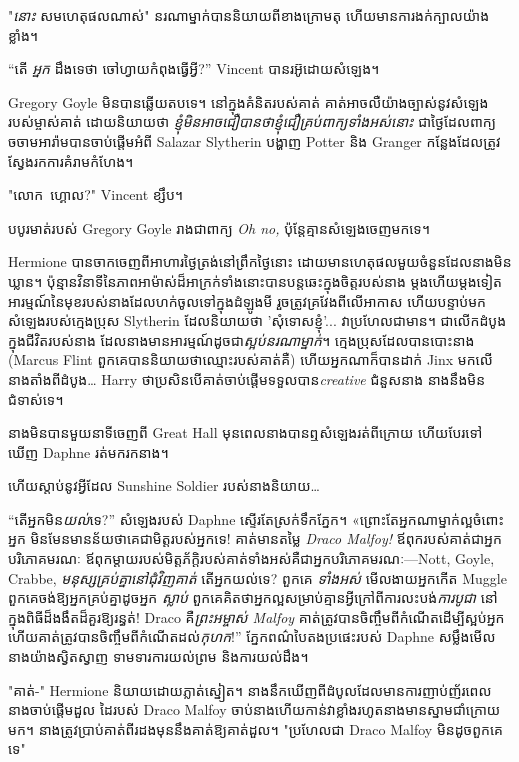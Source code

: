 {{{{"\emph{នោះ} សមហេតុផលណាស់" នរណាម្នាក់បាននិយាយពីខាងក្រោមតុ ហើយមានការងក់ក្បាលយ៉ាងខ្លាំង។

\later

“តើ \emph{អ្នក} ដឹងទេថា ចៅហ្វាយកំពុងធ្វើអ្វី?” Vincent បាន​រអ៊ូ​ដោយ​សំឡេង។

Gregory Goyle មិនបានឆ្លើយតបទេ។ នៅក្នុងគំនិតរបស់គាត់ គាត់អាចលឺយ៉ាងច្បាស់នូវសំឡេងរបស់ម្ចាស់គាត់ ដោយនិយាយថា \emph{ខ្ញុំមិនអាចជឿបានថាខ្ញុំជឿគ្រប់ពាក្យទាំងអស់នោះ} ជាថ្ងៃដែលពាក្យចចាមអារ៉ាមបានចាប់ផ្តើមអំពី Salazar Slytherin បង្ហាញ Potter និង Granger កន្លែងដែលត្រូវស្វែងរកការគំរាមកំហែង។

"លោក~ហ្គោល?" Vincent ខ្សឹប។

បបូរមាត់របស់ Gregory Goyle រាងជាពាក្យ \emph{Oh no,} ប៉ុន្តែគ្មានសំឡេងចេញមកទេ។

\later

Hermione បាន​ចាកចេញ​ពី​អាហារ​ថ្ងៃត្រង់​នៅ​ព្រឹក​ថ្ងៃ​នោះ ដោយ​មាន​ហេតុផល​មួយ​ចំនួន​ដែល​នាង​មិន​ឃ្លាន។ ប៉ុន្មានវិនាទីនៃភាពអាម៉ាស់ដ៏អាក្រក់ទាំងនោះបានបន្តឆេះក្នុងចិត្តរបស់នាង ម្តងហើយម្តងទៀត អារម្មណ៍នៃមុខរបស់នាងដែលហក់ចូលទៅក្នុងដំឡូងមី រួចត្រូវគ្រវែងពីលើអាកាស ហើយបន្ទាប់មកសំឡេងរបស់ក្មេងប្រុស Slytherin ដែលនិយាយថា 'សុំទោសខ្ញុំ'... វាប្រហែលជាមាន។ ជាលើកដំបូងក្នុងជីវិតរបស់នាង ដែលនាងមានអារម្មណ៍ដូចជា\emph{ស្អប់នរណាម្នាក់}។ ក្មេងប្រុសដែលបានបោះនាង (Marcus Flint ពួកគេបាននិយាយថាឈ្មោះរបស់គាត់គឺ) ហើយអ្នកណាក៏បានដាក់ Jinx មកលើនាងតាំងពីដំបូង… Harry ថាប្រសិនបើគាត់ចាប់ផ្តើមទទួលបាន\emph{creative} ជំនួសនាង នាងនឹងមិនជំទាស់ទេ។

នាង​មិន​បាន​មួយ​នាទី​ចេញ​ពី Great Hall មុន​ពេល​នាង​បាន​ឮ​សំឡេង​រត់​ពី​ក្រោយ ហើយ​បែរ​ទៅ​ឃើញ Daphne រត់​មក​រក​នាង។

ហើយស្តាប់នូវអ្វីដែល Sunshine Soldier របស់នាងនិយាយ…

“តើអ្នកមិន\emph{យល់}ទេ?” សំឡេងរបស់ Daphne ស្ទើរតែស្រក់ទឹកភ្នែក។ «ព្រោះ​តែ​អ្នក​ណា​ម្នាក់​ល្អ​ចំពោះ​អ្នក មិន​មែន​មាន​ន័យ​ថា​គេ​ជា​មិត្ត​របស់​អ្នក​ទេ! គាត់មានតម្លៃ \emph{Draco Malfoy!} ឪពុករបស់គាត់ជាអ្នកបរិភោគមរណៈ ឪពុកម្តាយរបស់មិត្តភ័ក្តិរបស់គាត់ទាំងអស់គឺជាអ្នកបរិភោគមរណៈ—Nott, Goyle, Crabbe, \emph{មនុស្សគ្រប់គ្នានៅជុំវិញគាត់} តើអ្នកយល់ទេ? ពួកគេ \emph{ទាំងអស់} មើលងាយអ្នកកើត Muggle ពួកគេចង់ឱ្យអ្នកគ្រប់គ្នាដូចអ្នក \emph{ស្លាប់} ពួកគេគិតថាអ្នកល្អសម្រាប់គ្មានអ្វីក្រៅពីការលះបង់\emph{ការបូជា} នៅក្នុងពិធីដ៏ងងឹតដ៏គួរឱ្យរន្ធត់! Draco គឺ\emph{ព្រះអម្ចាស់ Malfoy} គាត់ត្រូវបានចិញ្ចឹមពីកំណើតដើម្បីស្អប់អ្នក ហើយគាត់ត្រូវបានចិញ្ចឹមពីកំណើតដល់\emph{កុហក}!” ភ្នែកពណ៌បៃតងប្រផេះរបស់ Daphne សម្លឹងមើលនាងយ៉ាងស្វិតស្វាញ ទាមទារការយល់ព្រម និងការយល់ដឹង។

"គាត់-" Hermione និយាយដោយភ្លាត់ស្នៀត។ នាង​នឹកឃើញ​ពី​ដំបូល​ដែល​មាន​ការ​ញាប់​ញ័រ​ពេល​នាង​ចាប់ផ្តើម​ដួល ដៃ​របស់ Draco Malfoy ចាប់​នាង​ហើយ​កាន់​វា​ខ្លាំង​រហូត​នាង​មាន​ស្នាម​ជាំ​ក្រោយ​មក។ នាង​ត្រូវ​ប្រាប់​គាត់​ពីរ​ដង​មុន​នឹង​គាត់​ឱ្យ​គាត់​ដួល។ "ប្រហែលជា Draco Malfoy មិនដូចពួកគេទេ"

}}}}
